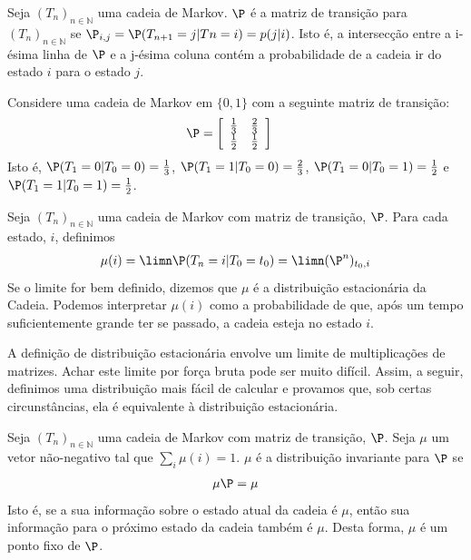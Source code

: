 \begin{definition}
 \label{defn:transition}
 Seja $(T_{n})_{n \in \mathbb{N}}$ uma
 cadeia de Markov. 
 $\P$ é a matriz de transição para
 $(T_{n})_{n \in \mathbb{N}}$ se 
 $\P_{i,j} = \P(T_{n+1}=j|T{n}=i) = p(j|i)$. 
 Isto é, a intersecção entre a i-ésima linha de
 $\P$ e a j-ésima coluna contém a probabilidade de
 a cadeia ir do estado $i$ para o estado $j$. 
\end{definition}

\begin{example}
 \label{ex:0-1-chain}
 Considere uma cadeia de Markov em $\{0,1\}$ com
 a seguinte matriz de transição:
 \begin{align*}
  \P &= \left[
  \begin{array}{cc}
   \frac{1}{3} & \frac{2}{3} \\
   \frac{1}{2} & \frac{1}{2}
  \end{array} \right ]
 \end{align*}
 Isto é, $\P(T_{1}=0|T_{0}=0) = \frac{1}{3}$,
 $\P(T_{1}=1|T_{0}=0) = \frac{2}{3}$,
 $\P(T_{1}=0|T_{0}=1) = \frac{1}{2}$ e
 $\P(T_{1}=1|T_{0}=1) = \frac{1}{2}$. 
\end{example}
       
\begin{definition}
 Seja $(T_{n})_{n \in \mathbb{N}}$ uma
 cadeia de Markov com matriz de transição, $\P$. 
 Para cada estado, $i$, definimos
 \begin{align*}
  \mu(i) = \limn \P(T_{n} = i|T_{0}=t_{0})
  = \limn (\P^n)_{t_{0},i}
 \end{align*}
 Se o limite for bem definido, dizemos que $\mu$ é a distribuição estacionária da Cadeia.
 Podemos interpretar $\mu(i)$ como a probabilidade de que, 
 após um tempo suficientemente grande ter se passado,
 a cadeia esteja no estado $i$. 
\end{definition}

A definição de distribuição estacionária envolve
um limite de multiplicações de matrizes.
Achar este limite por força bruta pode ser
muito difícil. Assim, a seguir, definimos uma
distribuição mais fácil de calcular e provamos que,
sob certas circunstâncias, ela é equivalente à
distribuição estacionária.

\begin{definition}
 \label{defn:invariant}
 Seja $(T_{n})_{n \in \mathbb{N}}$ uma
 cadeia de Markov com matriz de transição, $\P$. 
 Seja $\mu$ um vetor não-negativo tal que
 $\sum_{i}{\mu(i)} = 1$. 
 $\mu$ é a distribuição invariante para $\P$ se
 \begin{align*}
  \mu \P = \mu 
 \end{align*}
 Isto é, se a sua informação sobre o
 estado atual da cadeia é $\mu$, então sua
 informação para o próximo estado da cadeia
 também é $\mu$. Desta forma,
 $\mu$ é um ponto fixo de $\P$.
\end{definition}

